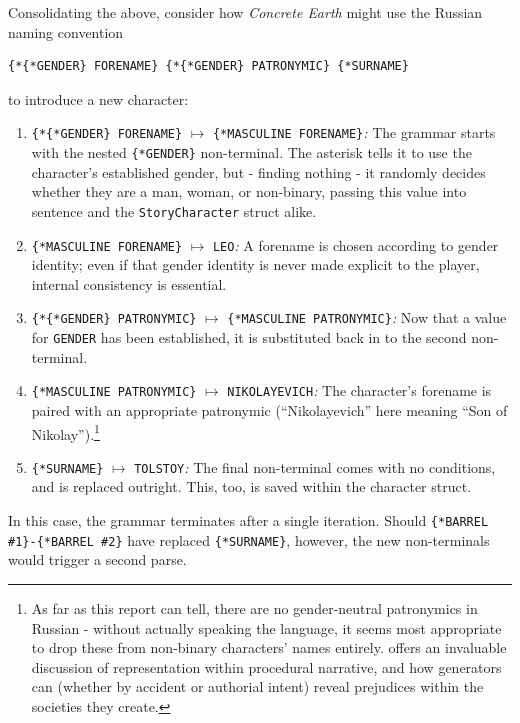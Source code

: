 \documentclass[a4paper, 11pt]{article}
\begin{document}
\begin{flushleft}
\vspace{5pt}\noindent
Consolidating the above, consider how \textit{Concrete Earth} might use the Russian naming convention
\begin{center}
\begin{BVerbatim}
{*{*GENDER} FORENAME} {*{*GENDER} PATRONYMIC} {*SURNAME}
\end{BVerbatim}
\end{center}
to introduce a new character:
\begin{enumerate}[label=\textit{\arabic*}\textit{.}, noitemsep]
\item \verb|{*{*GENDER} FORENAME}| $\mapsto$ \verb|{*MASCULINE FORENAME}|\textit{:} The grammar starts with the nested \verb|{*GENDER}| non-terminal. The asterisk tells it to use the character's established gender, but - finding nothing - it randomly decides whether they are a man, woman, or non-binary, passing this value into sentence and the \texttt{StoryCharacter} struct alike.
\item \verb|{*MASCULINE FORENAME}| $\mapsto$ \verb|LEO|\textit{:} A forename is chosen according to gender identity; even if that gender identity is never made explicit to the player, internal consistency is essential.
\item \verb|{*{*GENDER} PATRONYMIC}| $\mapsto$ \verb|{*MASCULINE PATRONYMIC}|\textit{:} Now that a value for \verb|GENDER| has been established, it is substituted back in to the second non-terminal.
\item \verb|{*MASCULINE PATRONYMIC}| $\mapsto$ \verb|NIKOLAYEVICH|\textit{:} The character's forename is paired with an appropriate patronymic (``Nikolayevich'' here meaning ``Son of Nikolay'').\footnote{As far as this report can tell, there are no gender-neutral patronymics in Russian - without actually speaking the language, it seems most appropriate to drop these from non-binary characters' names entirely. \citet{cook19} offers an invaluable discussion of representation within procedural narrative, and how generators can (whether by accident or authorial intent) reveal prejudices within the societies they create.}
\item \verb|{*SURNAME}| $\mapsto$ \verb|TOLSTOY|\textit{:} The final non-terminal comes with no conditions, and is replaced outright. This, too, is saved within the character struct.
\end{enumerate}
In this case, the grammar terminates after a single iteration. Should \verb|{*BARREL #1}-{*BARREL #2}| have replaced \verb|{*SURNAME}|, however, the new non-terminals would trigger a second parse.


\end{flushleft}
\end{document}
